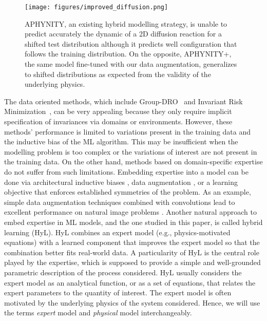 \begin{figure}[t]
    \centering
    \vspace{-.5em}
    \texttt{[image: figures/improved\_diffusion.png]}
    \vspace{-2.em}
    \caption{APHYNITY, an existing hybrid modelling strategy, is unable to predict accurately the dynamic of a 2D diffusion reaction for a shifted test distribution although it predicts well configuration that follows the training distribution. On the opposite, APHYNITY+, the same model fine-tuned with our data augmentation, generalizes to shifted distributions as expected from the validity of the underlying physics.}
    \label{fig:diffusion_shift}
    \vspace{-1em}
\end{figure}

The data oriented methods, which include Group-DRO~\citep{groupDRO_ICLR} and Invariant Risk Minimization~\citep[][IRM]{IRM}, can be very appealing because they only require implicit specification of invariances via domains or environments. However, these methods' performance is limited to variations present in the training data and the inductive bias of the ML algorithm. This may be insufficient when the modelling problem is too complex or the variations of interest are not present in the training data. On the other hand, methods based on domain-specific expertise do not suffer from such limitations. Embedding expertise into a model can be done via architectural inductive biases \citep{lecun_cnn, gnn}, data augmentation \citep{cubuk2019autoaugment}, or a learning objective \citep{lagrangian_nn} that enforces established symmetries of the problem. As an example, simple data augmentation techniques combined with convolutions lead to excellent performance on natural image problems \citep{cubuk2019autoaugment}. Another natural approach to embed expertise in ML models, and the one studied in this paper, is called hybrid learning (HyL). HyL combines an expert model (e.g., physics-motivated equations) with a learned component that improves the expert model so that the combination better fits real-world data. A particularity of HyL is the central role played by the expertise, which is supposed to provide a simple and well-grounded parametric description of the process considered. HyL usually considers the expert model as an analytical function, or as a set of equations, that relates the expert parameters to the quantity of interest. The expert model is often motivated by the underlying physics of the system considered. Hence, we will use the terms \textit{expert} model and \textit{physical} model interchangeably.

